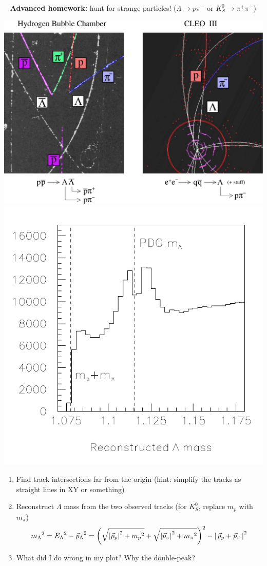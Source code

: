 \documentclass[landscape]{article}
\newenvironment{slide}{\mbox{ }\vfill}{\vfill \mbox{ } \pagebreak}
\begin{document}
\begin{slide}
\huge {\bf Advanced homework:} hunt for strange particles!
($\Lambda \to p \pi^-$ or $K^0_S \to \pi^+\pi^-$)

\begin{center}
  \includegraphics[width=0.55\linewidth]{2lambdas_sidebyside_small}
  \includegraphics[width=0.4\linewidth]{lambdamass}
\end{center}

\begin{enumerate}
  \item Find track intersections far from the origin (hint: simplify
    the tracks as straight lines in XY or something)
  \item Reconstruct $\Lambda$ mass from the two observed tracks (for
    $K^0_S$, replace $m_p$ with $m_\pi$)
\[ {m_\Lambda}^2 = {E_\Lambda}^2 - \mbox{$\vec{p}_\Lambda$}^2 = \left(\sqrt{\left|{\vec{p}_p}\right|^2 + {m_p}^2} + \sqrt{\left|{\vec{p}_\pi}\right|^2 + {m_\pi}^2}\right)^2 - \left| \, \vec{p}_p + \vec{p}_\pi \, \right|^2 \\ \]
  \item What did I do wrong in my plot?  Why the double-peak?
\end{enumerate}
\end{slide}
\end{document}
